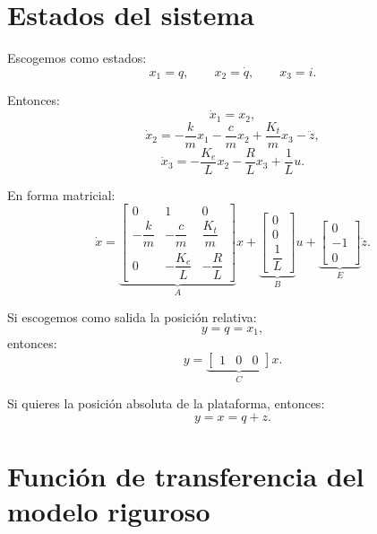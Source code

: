 \documentclass[11pt]{article}
\begin{document}
\section{Estados del sistema}

Escogemos como estados:
\begin{equation}
x_1 = q,\qquad x_2 = \dot{q},\qquad x_3 = i.
\end{equation}

Entonces:
\begin{equation}
\dot{x}_1 = x_2,
\label{eq:ss1}
\end{equation}
\begin{equation}
\dot{x}_2 = -\frac{k}{m}x_1 - \frac{c}{m}x_2 + \frac{K_t}{m}x_3 - \ddot{z},
\label{eq:ss2}
\end{equation}
\begin{equation}
\dot{x}_3 = -\frac{K_e}{L}x_2 - \frac{R}{L}x_3 + \frac{1}{L}u.
\label{eq:ss3}
\end{equation}

En forma matricial:
\begin{equation}
\dot{x} =
\underbrace{
\begin{bmatrix}
0 & 1 & 0\\
-\dfrac{k}{m} & -\dfrac{c}{m} & \dfrac{K_t}{m}\\
0 & -\dfrac{K_e}{L} & -\dfrac{R}{L}
\end{bmatrix}}_{A}
x
+
\underbrace{
\begin{bmatrix}
0\\
0\\
\dfrac{1}{L}
\end{bmatrix}}_{B}
u
+
\underbrace{
\begin{bmatrix}
0\\
-1\\
0
\end{bmatrix}}_{E}
\ddot{z}.
\label{eq:ss_matrix}
\end{equation}

Si escogemos como salida la posici\'on relativa:
\[
y=q=x_1,
\]
entonces:
\begin{equation}
y=
\underbrace{
\begin{bmatrix}
1 & 0 & 0
\end{bmatrix}}_{C}
x.
\end{equation}

Si quieres la posici\'on absoluta de la plataforma, entonces:
\[
y=x=q+z.
\]

\section{Funci\'on de transferencia del modelo riguroso}
\end{document}
